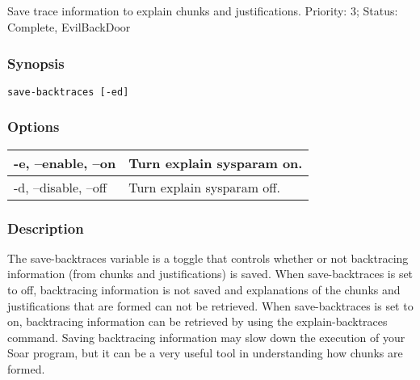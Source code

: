\subsection{}
\label{save-backtraces}
Save trace information to explain chunks and justifications. 
 Priority: 3; Status: Complete, EvilBackDoor
\subsubsection*{Synopsis}
\begin{verbatim}
save-backtraces [-ed]
\end{verbatim}
\subsubsection*{Options}
\begin{tabular}{|l|l|}
\hline 
 -e, --enable, --on  & Turn explain sysparam on.  \\
 \hline 
 -d, --disable, --off  & Turn explain sysparam off.  \\
 \hline 
\end{tabular}
\subsubsection*{Description}
 The save-backtraces variable is a toggle that controls whether or not backtracing information (from chunks and justifications) is saved. 
 When save-backtraces is set to off, backtracing information is not saved and explanations of the chunks and justifications that are formed can not be retrieved. When save-backtraces is set to on, backtracing information can be retrieved by using the explain-backtraces command. Saving backtracing information may slow down the execution of your Soar program, but it can be a very useful tool in understanding how chunks are formed. 
